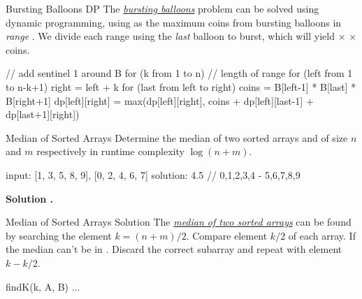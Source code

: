 \documentclass{cognito}
\begin{document}
\begin{note}{Bursting Balloons DP}
	The \hyperref[note:Bursting Balloons]{\it bursting balloons} problem can be solved using dynamic programming,
	using  as the maximum coins from bursting balloons in \emph{range} .
	We divide each range using the \emph{last} balloon to burst,
	which will yield  $\times$  $\times$  coins.
	\begin{largecode}
 // add sentinel 1 around B
 for (k from 1 to n)  // length of range
   for (left from 1 to n-k+1)
     right = left + k
     for (last from left to right)
       coins = B[left-1] * B[last] * B[right+1]
       dp[left][right] = max(dp[left][right],
         coins + dp[left][last-1] + dp[last+1][right])
	\end{largecode}
	\vspace{-5pt}
\end{note}

\begin{note}{Median of Sorted Arrays}
	Determine the median of two sorted arrays  and  of
	size $n$ and $m$ respectively in runtime complexity $\log (n + m)$.

	\begin{largecode}
 input: [1, 3, 5, 8, 9], [0, 2, 4, 6, 7]
 solution: 4.5  // 0,1,2,3,4 - 5,6,7,8,9
	\end{largecode}
	\bf Solution \hyperref[note:Median of Sorted Arrays Solution]{\solutionref}.
\end{note}

\begin{note}{Median of Sorted Arrays Solution}
	The \hyperref[note:Median of Sorted Arrays]{\it median of two sorted arrays} can be found by
	searching the element $k = (n+m)/2$. 
	Compare element $k/2$ of each array. If  the median can't be in .
	Discard the correct subarray and repeat with element $k - k/2$.
	
	\begin{largecode}
 findK(k, A, B)
 	...
	\end{largecode}
	\vspace{-5pt}
\end{note}
\end{document}

